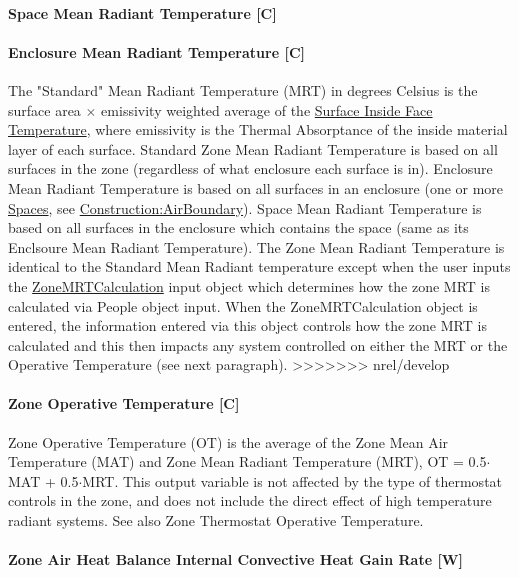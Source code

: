\paragraph{Space Mean Radiant Temperature {[}C{]}}\label{space-mean-radiant-temperature-c}
\paragraph{Enclosure Mean Radiant Temperature {[}C{]}}\label{enclosure-mean-radiant-temperature-c}

The "Standard" Mean Radiant Temperature (MRT) in degrees Celsius is the surface area $\times$ emissivity weighted average of the \hyperref[surface-inside-face-temperature-c]{Surface Inside Face Temperature}, where emissivity is the Thermal Absorptance of the inside material layer of each surface. Standard Zone Mean Radiant Temperature is based on all surfaces in the zone (regardless of what enclosure each surface is in). Enclosure Mean Radiant Temperature is based on all surfaces in an enclosure (one or more \hyperref[space]{Spaces}, see \hyperref[constructionairboundary]{Construction:AirBoundary}). Space Mean Radiant Temperature is based on all surfaces in the enclosure which contains the space (same as its Enclsoure Mean Radiant Temperature).  The Zone Mean Radiant Temperature is identical to the Standard Mean Radiant temperature except when the user inputs the \hyperref[zonemrtcalculation]{ZoneMRTCalculation} input object which determines how the zone MRT is calculated via People object input. When the ZoneMRTCalculation object is entered, the information entered via this object controls how the zone MRT is calculated and this then impacts any system controlled on either the MRT or the Operative Temperature (see next paragraph).
>>>>>>> nrel/develop

\paragraph{Zone Operative Temperature {[}C{]}}\label{zone-operative-temperature-c}

Zone Operative Temperature (OT) is the average of the Zone Mean Air Temperature (MAT) and Zone Mean Radiant Temperature (MRT), OT = 0.5$\cdot$MAT + 0.5$\cdot$MRT. This output variable is not affected by the type of thermostat controls in the zone, and does not include the direct effect of high temperature radiant systems. See also Zone Thermostat Operative Temperature.

\paragraph{Zone Air Heat Balance Internal Convective Heat Gain Rate {[}W{]}}\label{zone-air-heat-balance-internal-convective-heat-gain-rate-w}

